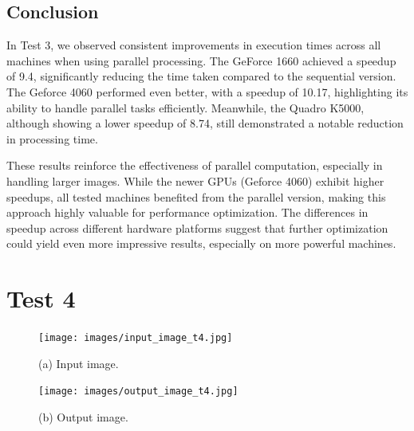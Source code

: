 \subsection{Conclusion}
In Test 3, we observed consistent improvements in execution times across all machines when using parallel processing. The GeForce 1660 achieved a speedup of 9.4, significantly reducing the time taken compared to the sequential version. The Geforce 4060 performed even better, with a speedup of 10.17, highlighting its ability to handle parallel tasks efficiently. Meanwhile, the Quadro K5000, although showing a lower speedup of 8.74, still demonstrated a notable reduction in processing time.

These results reinforce the effectiveness of parallel computation, especially in handling larger images. While the newer GPUs (Geforce 4060) exhibit higher speedups, all tested machines benefited from the parallel version, making this approach highly valuable for performance optimization. The differences in speedup across different hardware platforms suggest that further optimization could yield even more impressive results, especially on more powerful machines.        

\section{Test 4}
\begin{figure}[H]
    \centering
    \begin{minipage}[b]{0.45\textwidth}
        \centering
        \texttt{[image: images/input\_image\_t4.jpg]}
        \caption{(a) Input image.}
        \label{fig:test_4_input}
    \end{minipage}
    \hfill
    \begin{minipage}[b]{0.45\textwidth}
        \centering
        \texttt{[image: images/output\_image\_t4.jpg]}
        \caption{(b) Output image.}
        \label{fig:test_4_output}
    \end{minipage}
    \end{figure}


